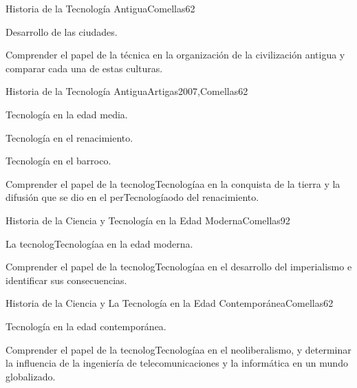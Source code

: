 \begin{syllabus}
\begin{unit}{Historia de la Tecnología Antigua}{Comellas}{6}{2}
\begin{topics}
    \item Desarrollo de las ciudades.
\end{topics}
\begin{unitgoals}
    \item Comprender el papel de la técnica en la organización de la civilización antigua y comparar cada una de estas culturas.
\end{unitgoals}
\end{unit}

\begin{unit}{Historia de la Tecnología Antigua}{Artigas2007,Comellas}{6}{2}
\begin{topics}
    \item Tecnología en la edad media.
    \item Tecnología en el renacimiento.
    \item Tecnología en el barroco.
\end{topics}
\begin{unitgoals}
    \item Comprender el  papel de la tecnologTecnologíaa en la conquista de la tierra y la difusión que se dio en el perTecnologíaodo del renacimiento.
\end{unitgoals}

\end{unit}

\begin{unit}{Historia de la Ciencia y Tecnología en la Edad Moderna}{Comellas}{9}{2}
\begin{topics}
      \item {La tecnologTecnologíaa en la edad moderna.}
\end{topics}
\begin{unitgoals}
	\item Comprender el  papel de la tecnologTecnologíaa en el desarrollo del imperialismo e identificar sus consecuencias.
\end{unitgoals}
\end{unit}

\begin{unit}{Historia de la Ciencia y La Tecnología en la Edad Contemporánea}{Comellas}{6}{2}
\begin{topics}
      \item {Tecnología en la edad contemporánea.}
\end{topics}
\begin{unitgoals}
	\item Comprender el  papel de la tecnologTecnologíaa en el neoliberalismo, y determinar la influencia de la ingeniería de telecomunicaciones y la informática en un mundo globalizado.
\end{unitgoals}
\end{unit}


\end{syllabus}
